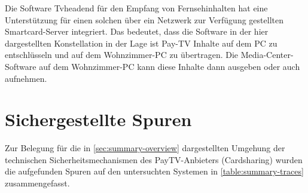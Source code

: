 Die Software Tvheadend für den Empfang von Fernsehinhalten hat eine Unterstützung für einen solchen über ein Netzwerk zur Verfügung gestellten Smartcard-Server integriert. Das bedeutet, dass die Software in der hier dargestellten Konstellation in der Lage ist Pay-TV Inhalte auf dem PC zu entschlüsseln und auf dem Wohnzimmer-PC zu übertragen. Die Media-Center-Software auf dem Wohnzimmer-PC kann diese Inhalte dann ausgeben oder auch aufnehmen.

\section{Sichergestellte Spuren}

Zur Belegung für die in \autoref{sec:summary-overview} dargestellten Umgehung der technischen Sicherheitsmechanismen des PayTV-Anbieters (Cardsharing) wurden die aufgefunden Spuren auf den untersuchten Systemen in \autoref{table:summary-traces} zusammengefasst.

